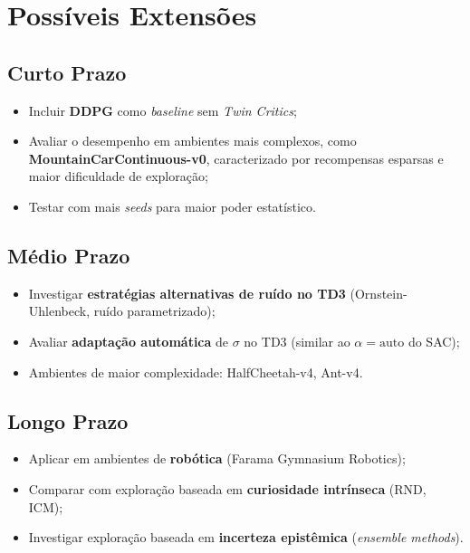 \documentclass{Supervised_Reinforcement_Learningqsport}
\begin{document}
\section{Possíveis Extensões}

\subsection{Curto Prazo}

\begin{itemize}
    \item Incluir \textbf{DDPG} como \textit{baseline} sem \textit{Twin Critics};
    \item Avaliar o desempenho em ambientes mais complexos, como \textbf{MountainCarContinuous-v0}, caracterizado por recompensas esparsas e maior dificuldade de exploração;
    \item Testar com mais \textit{seeds} para maior poder estatístico.
\end{itemize}

\subsection{Médio Prazo}

\begin{itemize}
    \item Investigar \textbf{estratégias alternativas de ruído no TD3} (Ornstein-Uhlenbeck, ruído parametrizado);
    \item Avaliar \textbf{adaptação automática} de $\sigma$ no TD3 (similar ao $\alpha=\mathrm{auto}$ do SAC);
    \item Ambientes de maior complexidade: HalfCheetah-v4, Ant-v4.
\end{itemize}

\subsection{Longo Prazo}

\begin{itemize}
    \item Aplicar em ambientes de \textbf{robótica} (Farama Gymnasium Robotics);
    \item Comparar com exploração baseada em \textbf{curiosidade intrínseca} (RND, ICM);
    \item Investigar exploração baseada em \textbf{incerteza epistêmica} (\textit{ensemble methods}).
\end{itemize}
\end{document}

